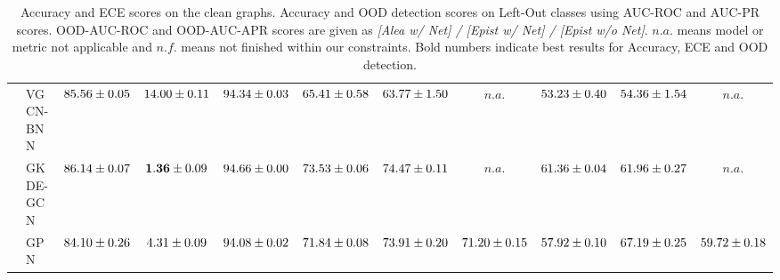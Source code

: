 \begin{table*}[!h]
{\begin{tabular}{ll|cc|cccc|ccc}
        & VGCN-BNN & ${85.56\tiny \pm 0.05}$ & ${14.00\tiny \pm 0.11}$ & ${94.34\tiny \pm 0.03}$ & ${65.41\tiny \pm 0.58}$ & ${63.77\tiny \pm 1.50}$ & $n.a.$ & ${53.23\tiny \pm 0.40}$ & ${54.36\tiny \pm 1.54}$ & $n.a.$\\
        & GKDE-GCN & ${86.14\tiny \pm 0.07}$ & ${\mathbf{1.36}\tiny \pm 0.09}$ & ${94.66\tiny \pm 0.00}$ & ${73.53\tiny \pm 0.06}$ & ${74.47\tiny \pm 0.11}$ & $n.a.$ & ${61.36\tiny \pm 0.04}$ & ${61.96\tiny \pm 0.27}$ & $n.a.$\\
        & GPN & ${84.10\tiny \pm 0.26}$ & ${4.31\tiny \pm 0.09}$ & ${94.08\tiny \pm 0.02}$ & ${71.84\tiny \pm 0.08}$ & ${73.91\tiny \pm 0.20}$ & ${{71.20}\tiny \pm 0.15}$ & ${57.92\tiny \pm 0.10}$ & ${67.19\tiny \pm 0.25}$ & ${{59.72}\tiny \pm 0.18}$\\


        \bottomrule
    \end{tabular}}
    \caption{Accuracy and ECE scores on the clean graphs. Accuracy and OOD detection scores on Left-Out classes using AUC-ROC and AUC-PR scores. OOD-AUC-ROC and OOD-AUC-APR scores are given as \emph{[Alea w/ Net] / [Epist w/ Net] / [Epist w/o Net]}. $n.a.$ means model or metric not applicable and $n.f.$ means not finished within our constraints. Bold numbers indicate best results for Accuracy, ECE and OOD detection.}
    \label{tab:clean_loc_auroc_one}
\end{table*}



